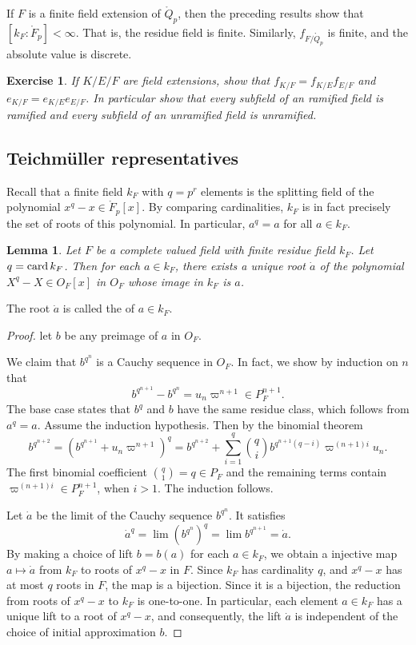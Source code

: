 \documentclass{amsart}
\newtheorem{lemma}[equation]{Lemma}
\newtheorem{exercise}{Exercise}
\begin{document}
If $F$ is a finite field extension of $\ring{Q}_p$, then the preceding results
show that $[k_F:\ring{F}_p]<\infty$.  That is, the residue field is finite.
Similarly, $f_{F/\ring{Q}_p}$ is finite, and the absolute value is discrete.

\begin{exercise}\label{ex:e-m}  If $K/E/F$ are field extensions, show that
$f_{K/F}=f_{K/E}f_{E/F}$ and $e_{K/F}=e_{K/E}e_{E/F}$.  In particular show
that every subfield of an ramified field is ramified and every subfield of
an unramified field is unramified.
\end{exercise}

\subsection{Teichm\"uller representatives}

Recall that a finite field $k_F$ with $q=p^r$ elements is the splitting field of 
the polynomial $x^q-x\in \ring{F}_p[x]$.  By comparing cardinalities, $k_F$ is in fact
precisely the set of roots of this polynomial.  In particular, $a^q=a$ for all
$a\in k_F$.

\begin{lemma}  Let $F$ be a complete valued field with finite residue field $k_F$.
Let $q = {\operatorname{card}}\,k_F$.  Then for each $a\in k_F$, there exists a unique root $\dot a$ of
the polynomial $X^q-X\in O_F[x]$ in $O_F$ whose image in $k_F$ is $a$.
\end{lemma}

The root $\dot a$ is called the  of $a\in k_F$.

\begin{proof} let $b$ be any preimage of $a$ in $O_F$.  

We claim that $b^{q^n}$ is a Cauchy sequence in $O_F$. In fact, we show by induction
on $n$ 
that 
\[
b^{q^{n+1}} - b^{q^n} = u_n\varpi^{n+1} \in P_F^{n+1}.
\]
The base case states that $b^q$ and $b$ have the same residue class, which follows from
 $a^q = a$.
Assume the induction hypothesis.
Then by the binomial theorem
\[
b^{q^{n+2}} = (b^{q^{n+1}} + u_n\varpi^{n+1})^q 
= b^{q^{n+2}} + {\sum_{i=1}^q {q\choose i}b^{q^{n+1}(q-i)} \varpi^{(n+1)i}u_n}.
\]
The first binomial coefficient ${q\choose 1} = q\in P_F$ and the
remaining terms contain $\varpi^{(n+1)i}\in P_F^{n+1}$, when $i>1$. The induction
follows.

Let $\dot a$ be the limit of the Cauchy sequence $b^{q^n}$. 
It satisfies
\[
\dot a ^q = \lim (b^{q^n})^q = \lim b^{q^{n+1}} = \dot a.
\]
By making a choice of lift $b=b(a)$ for each $a\in k_F$, we obtain 
 a injective map $a\mapsto \dot a$ from $k_F$ to roots of $x^q-x$ in $F$.  Since
$k_F$ has cardinality $q$, and $x^q-x$ has at most $q$ roots in $F$, 
the map is a bijection.  Since it is a bijection, the reduction from roots of
$x^q-x$ to $k_F$ is one-to-one.  In particular, each element $a\in k_F$ has a unique
lift to a root of $x^q-x$, and consequently, the lift $\dot a$ is
 independent of the choice of initial approximation $b$. 
\end{proof}
\end{document}

